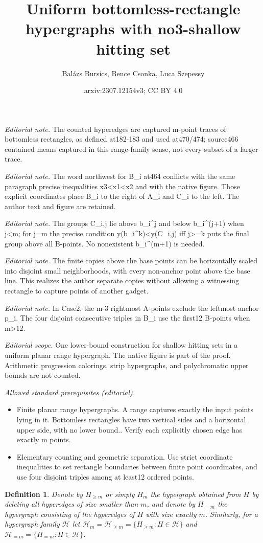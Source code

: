 \documentclass[10pt,a4paper]{amsart}
\title{Uniform bottomless-rectangle hypergraphs with no3-shallow hitting set}
\author{Balázs Bursics, Bence Csonka, Luca Szepessy}
\date{arxiv:2307.12154v3; CC BY 4.0}
\newcommand{\HH}{\mathcal{H}}
\newtheorem{definition}{Definition}
\begin{document}
\maketitle
\noindent\textit{Editorial note.} The counted hyperedges are captured m-point traces of bottomless rectangles, as defined at182-183 and used at470/474; source466 contained means captured in this range-family sense, not every subset of a larger trace.\par\medskip
\noindent\textit{Editorial note.} The word northwest for B\_i at464 conflicts with the same paragraph precise inequalities x3<x1<x2 and with the native figure. Those explicit coordinates place B\_i to the right of A\_i and C\_i to the left. The author text and figure are retained.\par\medskip
\noindent\textit{Editorial note.} The groups C\_i,j lie above b\_i\textasciicircum{}j and below b\_i\textasciicircum{}(j+1) when j<m; for j=m the precise condition y(b\_i\textasciicircum{}k)<y(C\_i,j) iff j>=k puts the final group above all B-points. No nonexistent b\_i\textasciicircum{}(m+1) is needed.\par\medskip
\noindent\textit{Editorial note.} The finite copies above the base points can be horizontally scaled into disjoint small neighborhoods, with every non-anchor point above the base line. This realizes the author separate copies without allowing a witnessing rectangle to capture points of another gadget.\par\medskip
\noindent\textit{Editorial note.} In Case2, the m-3 rightmost A-points exclude the leftmost anchor p\_i. The four disjoint consecutive triples in B\_i use the first12 B-points when m>12.\par\medskip
\noindent\textit{Editorial scope.} One lower-bound construction for shallow hitting sets in a uniform planar range hypergraph. The native figure is part of the proof. Arithmetic progression colorings, strip hypergraphs, and polychromatic upper bounds are not counted.\par\medskip
\noindent\textit{Allowed standard prerequisites (editorial).}\begin{itemize}
\item Finite planar range hypergraphs. A range captures exactly the input points lying in it. Bottomless rectangles have two vertical sides and a horizontal upper side, with no lower bound.. Verify each explicitly chosen edge has exactly m points.
\item Elementary counting and geometric separation. Use strict coordinate inequalities to set rectangle boundaries between finite point coordinates, and use four disjoint triples among at least12 ordered points.
\end{itemize}\medskip
\begin{definition} Denote by $H_{\ge m}$ or simply $H_m$ the hypergraph obtained from $H$ by deleting all hyperedges of size smaller than $m$, and denote by $H_{=m}$ the hypergraph consisting of the hyperedges of $H$ with size exactly $m$. Similarly, for a hypergraph family $\mathcal{H}$ let $\HH_m=\HH_{\ge m}=\{H_{\ge m}:H\in\HH\}$ and $\HH_{=m}=\{H_{=m}:H\in\HH\}$.
\end{definition}
\end{document}
